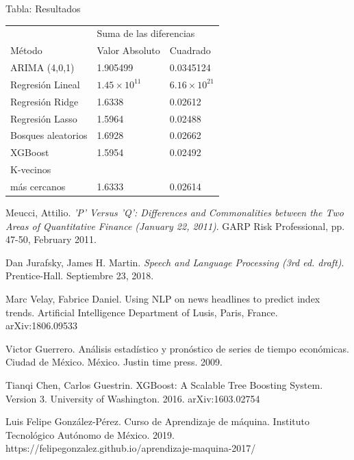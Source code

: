 \documentclass[12pt,reqno,letter]{article}
\begin{document}
\begin{multicols}{2}
\begin{center}
\caption{Tabla: Resultados}
\centering
\begin{tabular}{ll|l}
                       & \multicolumn{2}{l}{Suma de las diferencias}         \\ 
\cline{2-3}
Método                 & \multicolumn{1}{l|}{Valor Absoluto} & Cuadrado      \\ 
\cline{2-3}
ARIMA (4,0,1)          & 1.905499                            & 0.0345124     \\
Regresión Lineal       & $1.45\times10^{11}$                 & $6.16 \times 10^{21}$  \\
Regresión Ridge        & 1.6338                              & 0.02612       \\
Regresión Lasso        & 1.5964                              & \cellcolor[HTML]{C9CFEC} 0.02488       \\
Bosques aleatorios     & 1.6928                              & 0.02662       \\
XGBoost                & \cellcolor[HTML]{C9CFEC}1.5954                              & 0.02492       \\
K-vecinos \\ más cercanos & 1.6333                              & 0.02614                   
\end{tabular}
\end{center}
	\end{multicols}
	
	
	\begin{thebibliography}{1}

	Meucci, Attilio.
	\textit{'P' Versus 'Q': Differences and Commonalities between the Two Areas of Quantitative Finance (January 22, 2011)}. GARP Risk Professional, pp. 47-50, February 2011.

	Dan Jurafsky, James H. Martin. \textit{Speech and Language Processing (3rd ed. draft)}. Prentice-Hall. Septiembre 23, 2018.
	
	Marc Velay, Fabrice Daniel. Using NLP on news headlines to predict index trends. Artificial Intelligence Department of Lusis, Paris, France. arXiv:1806.09533
	
	Victor Guerrero. Análisis estadístico y pronóstico de series de tiempo económicas. Ciudad de México. México. Justin time press. 2009.
	
	Tianqi Chen, Carlos Guestrin. XGBoost: A Scalable Tree Boosting System. Version 3. University of Washington. 2016. arXiv:1603.02754
	
	Luis Felipe González-Pérez. Curso de Aprendizaje de máquina. Instituto Tecnológico Autónomo de México. 2019. https://felipegonzalez.github.io/aprendizaje-maquina-2017/
	\end{thebibliography}
\end{document}

